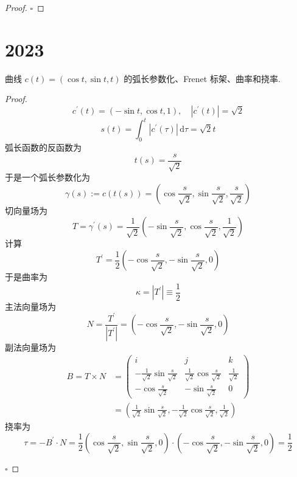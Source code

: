 \documentclass[../../main.tex]{subfiles}
\begin{document}
\begin{proof}
    \hfill $\square$
\end{proof}

\section{2023}
\begin{problem}
曲线 $c(t) = (\cos t, \sin t, t)$ 的弧长参数化、Frenet 标架、曲率和挠率.
\end{problem}

\begin{proof}
    \[
    c^{\prime} \left( t \right)= \left( -\sin t,\cos t,1 \right)  ,\quad \left| c^{\prime} \left( t \right)  \right|= \sqrt{2} 
    \]  \[
    s\left( t \right)= \int_{0}^{t}\left| c^{\prime} \left( \tau  \right)  \right| \,\mathrm{d} \tau =  \sqrt{2}t 
    \]弧长函数的反函数为 \[
    t\left( s \right)= \frac{s }{\sqrt{2} }  
    \]于是一个弧长参数化为 \[
     \gamma \left( s \right):= c\left( t\left( s \right)  \right)  = \left( \cos \frac{s }{\sqrt{2} },\sin \frac{s }{\sqrt{2} },\frac{s }{\sqrt{2} }    \right) 
    \]切向量场为 \[
    T=  \gamma ^{\prime} \left( s \right)= \frac{1 }{\sqrt{2} }\left( -\sin \frac{s }{\sqrt{2} }, \cos \frac{s }{\sqrt{2} },\frac{1 }{\sqrt{2} }    \right)   
    \]计算\[
   T^{\prime} = \frac{1}{2}\left( -\cos \frac{s }{\sqrt{2} }, -\sin \frac{s }{\sqrt{2} },0   \right) 
    \]于是曲率为 \[
     \kappa = \left| T^{\prime}  \right|\equiv \frac{1}{2} 
    \]主法向量场为 \[
    N= \frac{T^{\prime}  }{\left| T^{\prime}  \right|  }  = \left( -\cos \frac{s }{\sqrt{2} },-\sin \frac{s }{\sqrt{2} },0   \right) 
    \]副法向量场为 \[
    \begin{aligned}
    B= T\times N &= \begin{pmatrix} 
        i&j&k\\ 
        - \frac{1 }{\sqrt{2} }  \sin \frac{s }{\sqrt{2} }& \frac{1 }{\sqrt{2} }\cos \frac{s }{\sqrt{2} }&\frac{1 }{\sqrt{2} }\\ 
         -\cos \frac{s }{\sqrt{2} }&-\sin \frac{s }{\sqrt{2} }&0      
    \end{pmatrix}\\ 
     &= \left( \frac{1 }{\sqrt{2} }\sin \frac{s }{\sqrt{2} },-\frac{1 }{\sqrt{2} }\cos \frac{s }{\sqrt{2} },\frac{1 }{\sqrt{2} }      \right)  
    \end{aligned}
    \]挠率为 \[
    \tau = -B^{\prime} \cdot N= \frac{1}{2}\left( \cos \frac{s }{\sqrt{2} },\sin \frac{s }{\sqrt{2} },0   \right)\cdot \left( -\cos \frac{s }{\sqrt{2} },-\sin \frac{s }{\sqrt{2} },0   \right)= \frac{1}{2}  
    \]

    \hfill $\square$
\end{proof}
\end{document}
